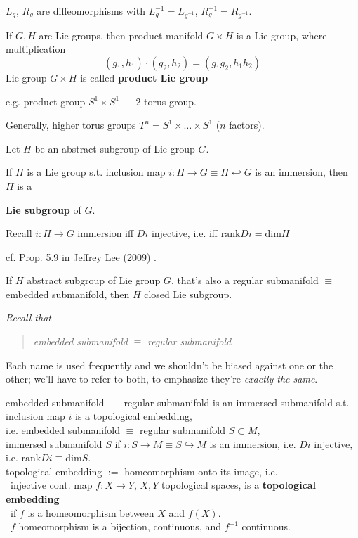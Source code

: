 $L_g$, $R_g$ are diffeomorphisms with $L_g^{-1} = L_{g^{-1}}$, $R_g^{-1} = R_{g^{-1}}$.

\begin{definition}
	If $G,H$ are Lie groups, then product manifold $G\times H$ is a Lie group, where multiplication
	\[
	(g_1, h_1) \cdot (g_2, h_2) = (g_1g_2, h_1h_2)
	\]
	Lie group $G\times H$ is called \textbf{product Lie group}
\end{definition}
e.g. product group $S^1 \times S^1 \equiv $ 2-torus group.

Generally, higher torus groups $T^n = S^1 \times \dots \times S^1$ ($n$ factors).

\begin{definition}
	Let $H$ be an abstract subgroup of Lie group $G$. 
	
	If $H$ is a Lie group s.t. inclusion map $i: H \to G \equiv H \hookleftarrow G$ is an immersion, then $H$ is a 

	\textbf{Lie subgroup} of $G$.
\end{definition}
Recall $i : H \to G$ immersion iff $Di$ injective, i.e.	iff $\text{rank}{Di} = \text{dim}{H}$


cf. Prop. 5.9 in Jeffrey Lee (2009) \cite{dgdt:JLee2009}.
\begin{proposition}
	If $H$ abstract subgroup of Lie group $G$, that's also a regular submanifold $\equiv$ embedded submanifold, then $H$ closed Lie subgroup.
\end{proposition}





	



\emph{Recall that} 
\begin{quote}
	\emph{embedded submanifold} $\equiv $ \emph{regular submanifold}
\end{quote}
Each name is used frequently and we shouldn't be biased against one or the other; we'll have to refer to both, to emphasize they're \emph{exactly the same}.

embedded submanifold $\equiv $ regular submanifold is an immersed submanifold s.t. inclusion map $i$ is a topological embedding, \\
i.e. embedded submanifold $\equiv $ regular submanifold $S \subset M$,  \\
immersed submanifold $S$ if $i:S \to M \equiv S \hookrightarrow M$ is an immersion, i.e. $Di$ injective, i.e. $\text{rank}Di \equiv \text{dim}S$. \\
topological embedding $:=$ homeomorphism onto its image, i.e. \\
\qquad \, injective cont. map $f:X \to Y$, $X, Y$ topological spaces, is a \textbf{topological embedding} \\
\qquad \qquad \, if $f$ is a homeomorphism between $X$ and $f(X)$.  \\
\qquad \qquad \qquad \, $f$ homeomorphism is a bijection, continuous, and $f^{-1}$ continuous. \\


